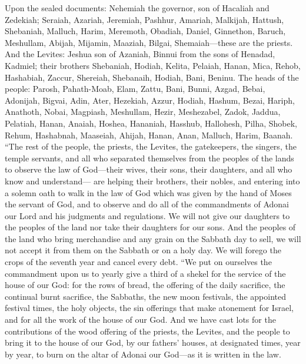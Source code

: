 \begin{biblechapter} %
 Upon the sealed documents: Nehemiah the governor, son of Hacaliah and Zedekiah;
\verse Seraiah, Azariah, Jeremiah,
\verse Pashhur, Amariah, Malkijah,
\verse Hattush, Shebaniah, Malluch,
\verse Harim, Meremoth, Obadiah,
\verse Daniel, Ginnethon, Baruch,
\verse Meshullam, Abijah, Mijamin,
\verse Maaziah, Bilgai, Shemaiah—these are the priests.
\verse And the Levites: Jeshua son of Azaniah, Binnui from the sons of Henadad, Kadmiel;
\verse their brothers Shebaniah, Hodiah, Kelita, Pelaiah, Hanan,
\verse Mica, Rehob, Hashabiah,
\verse Zaccur, Shereiah, Shebanaih,
\verse Hodiah, Bani, Beninu.
\verse The heads of the people: Parosh, Pahath-Moab, Elam, Zattu, Bani,
\verse Bunni, Azgad, Bebai,
\verse Adonijah, Bigvai, Adin,
\verse Ater, Hezekiah, Azzur,
\verse Hodiah, Hashum, Bezai,
\verse Hariph, Anathoth, Nobai,
\verse Magpiash, Meshullam, Hezir,
\verse Meshezabel, Zadok, Jaddua,
\verse Pelatiah, Hanan, Anaiah,
\verse Hoshea, Hananiah, Hasshub,
\verse Hallohesh, Pilha, Shobek,
\verse Rehum, Hashabnah, Maaseiah,
\verse Ahijah, Hanan, Anan,
\verse Malluch, Harim, Baanah.
 “The rest of the people, the priests, the Levites, the gatekeepers, the singers, the temple servants, and all who separated themselves from the peoples of the lands to observe the law of God—their wives, their sons, their daughters, and all who know and understand—
\verse are helping their brothers, their nobles, and entering into a solemn oath to walk in the law of God which was given by the hand of Moses the servant of God, and to observe and do all of the commandments of Adonai our Lord and his judgments and regulations.
\verse We will not give our daughters to the peoples of the land nor take their daughters for our sons.
\verse And the peoples of the land who bring merchandise and any grain on the Sabbath day to sell, we will not accept it from them on the Sabbath or on a holy day. We will forego the crops of the seventh year and cancel every debt.
\verse “We put on ourselves the commandment upon us to yearly give a third of a shekel for the service of the house of our God:
\verse for the rows of bread, the offering of the daily sacrifice, the continual burnt sacrifice, the Sabbaths, the new moon festivals, the appointed festival times, the holy objects, the sin offerings that make atonement for Israel, and for all the work of the house of our God.
\verse And we have cast lots for the contributions of the wood offering of the priests, the Levites, and the people to bring it to the house of our God, by our fathers’ houses, at designated times, year by year, to burn on the altar of Adonai our God—as it is written in the law.

\end{biblechapter}
